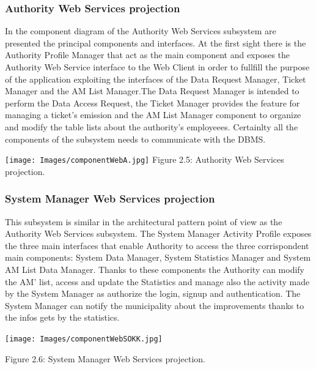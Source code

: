 \documentclass[12pt]{article}
\begin{document}
\subsubsection{Authority Web Services projection}
\vspace{5mm}
In the component diagram of the Authority Web Services subsystem are presented the principal components and interfaces. At the first sight there is the Authority Profile Manager that act as the main component and exposes the Authority Web Service interface to the Web Client in order to fullfill the purpose of the application exploiting the interfaces of the Data Request Manager, Ticket Manager and the AM List Manager.The Data Request Manager is intended to perform the Data Access Request, the Ticket Manager provides the feature for managing a ticket’s emission and the AM List Manager component to organize and modify the table lists about the authority’s employeees. Certainlty all the components of the subsystem needs to communicate with the DBMS.
\begin{center}
\texttt{[image: Images/componentWebA.jpg]}
\vspace{2mm}
Figure 2.5: Authority Web Services projection.
\end{center}
\vspace{3mm}
\subsubsection{System Manager Web Services projection}
\vspace{5mm}
This subsystem is similar in the architectural pattern point of view as the Authority Web Services subsystem. The System Manager Activity Profile exposes the three main interfaces that enable Authority to access the three corrispondent main components: System Data Manager, System Statistics Manager and System AM List Data Manager.
Thanks to these components the Authority can modify the AM' list, access and update the Statistics and manage also the activity made by the System Manager as authorize the login, signup and authentication. The System Manager can notify the municipality about the improvements thanks to the infos gets by the statistics.


\begin{center}
\texttt{[image: Images/componentWebSOKK.jpg]}

\vspace{2mm}
Figure 2.6: System Manager Web Services projection.
\end{center}
\end{document}
